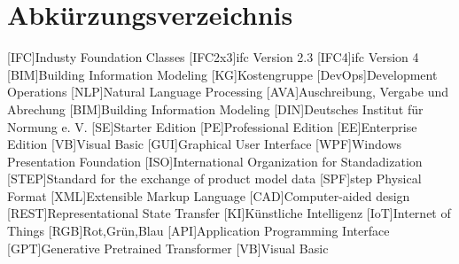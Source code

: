 \chapter{Abkürzungsverzeichnis}
\begin{acronym}
[IFC]{Industy Foundation Classes}
[IFC2x3]{\ac{ifc} Version 2.3}
[IFC4]{\ac{ifc} Version 4}
[BIM]{Building Information Modeling}
[KG]{Kostengruppe}
[DevOps]{Development Operations}
[NLP]{Natural Language Processing}
[AVA]{Auschreibung, Vergabe und Abrechung}
[BIM]{Building Information Modeling}
[DIN]{Deutsches Institut für Normung e. V.}
[SE]{Starter Edition}
[PE]{Professional Edition}
[EE]{Enterprise Edition}
[VB]{Visual Basic}
[GUI]{Graphical User Interface}
[WPF]{Windows Presentation Foundation}
[ISO]{International Organization for Standadization}
[STEP]{Standard for the exchange of product model data}
[SPF]{\ac{step} Physical Format}
[XML]{Extensible Markup Language}
[CAD]{Computer-aided design}
[REST]{Representational State Transfer}
[KI]{Künstliche Intelligenz}
[IoT]{Internet of Things}
[RGB]{Rot,Grün,Blau}
[API]{Application Programming Interface}
[GPT]{Generative Pretrained Transformer}
[VB]{Visual Basic}
\end{acronym}